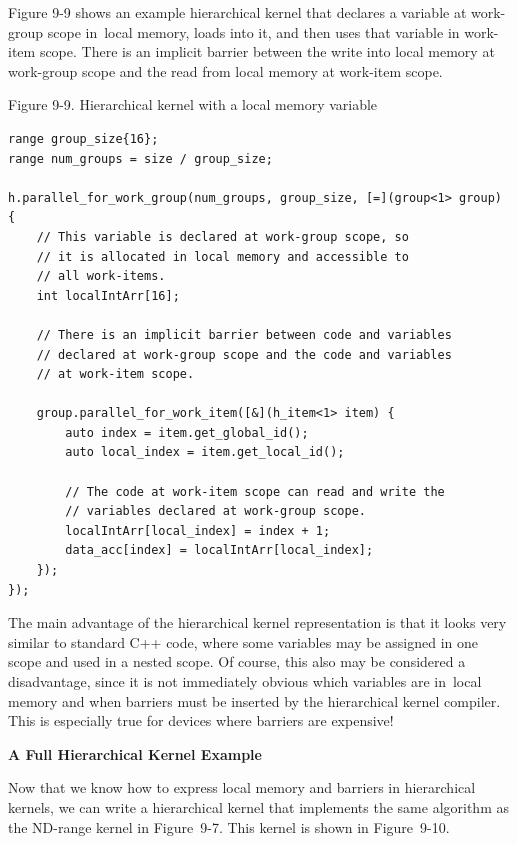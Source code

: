 Figure 9-9 shows an example hierarchical kernel that declares a variable at work-group scope in local memory, loads into it, and then uses that variable in work-item scope. There is an implicit barrier between the write into local memory at work-group scope and the read from local memory at work-item scope.\par

\hspace*{\fill} \par %
Figure 9-9. Hierarchical kernel with a local memory variable
\begin{lstlisting}[caption={}]
range group_size{16};
range num_groups = size / group_size;

h.parallel_for_work_group(num_groups, group_size, [=](group<1> group) {
	// This variable is declared at work-group scope, so
	// it is allocated in local memory and accessible to
	// all work-items.
	int localIntArr[16];
	
	// There is an implicit barrier between code and variables
	// declared at work-group scope and the code and variables
	// at work-item scope.
	
	group.parallel_for_work_item([&](h_item<1> item) {
		auto index = item.get_global_id();
		auto local_index = item.get_local_id();
		
		// The code at work-item scope can read and write the
		// variables declared at work-group scope.
		localIntArr[local_index] = index + 1;
		data_acc[index] = localIntArr[local_index];
	});
});
\end{lstlisting}

The main advantage of the hierarchical kernel representation is that it looks very similar to standard C++ code, where some variables may be assigned in one scope and used in a nested scope. Of course, this also may be considered a disadvantage, since it is not immediately obvious which variables are in local memory and when barriers must be inserted by the hierarchical kernel compiler. This is especially true for devices where barriers are expensive!\par

\hspace*{\fill} \par %
\textbf{A Full Hierarchical Kernel Example}

Now that we know how to express local memory and barriers in hierarchical kernels, we can write a hierarchical kernel that implements the same algorithm as the ND-range kernel in Figure 9-7. This kernel is shown in Figure 9-10.\par

